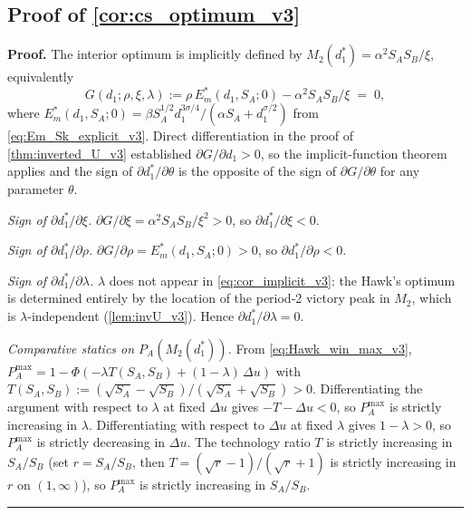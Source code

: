 \documentclass[11pt,twoside]{extarticle}
\newenvironment{proof}[1][Proof]{\noindent \textbf{#1.} }{\ \rule{0.5em}{0.5em}}
\begin{document}
\subsection*{Proof of \autoref{cor:cs_optimum_v3}} \label{app:proof:cs_optimum_v3}
\begin{proof}
The interior optimum is implicitly defined by $M_2(d_1^*)=\alpha^2 S_A S_B/\xi$, equivalently
\begin{equation}\label{eq:cor_implicit_v3}
G(d_1;\rho,\xi,\lambda):=\rho\,E_m^*(d_1,S_A;0)-\alpha^2 S_A S_B/\xi\;=\;0,
\end{equation}
where $E_m^*(d_1,S_A;0)=\beta S_A^{1/2} d_1^{3\sigma/4}/(\alpha S_A+d_1^{\sigma/2})$ from \autoref{eq:Em_Sk_explicit_v3}. Direct differentiation in the proof of \autoref{thm:inverted_U_v3} established $\partial G/\partial d_1>0$, so the implicit-function theorem applies and the sign of $\partial d_1^*/\partial\theta$ is the opposite of the sign of $\partial G/\partial\theta$ for any parameter $\theta$.

\emph{Sign of $\partial d_1^*/\partial\xi$.} $\partial G/\partial\xi=\alpha^2 S_A S_B/\xi^2>0$, so $\partial d_1^*/\partial\xi<0$.

\emph{Sign of $\partial d_1^*/\partial\rho$.} $\partial G/\partial\rho=E_m^*(d_1,S_A;0)>0$, so $\partial d_1^*/\partial\rho<0$.

\emph{Sign of $\partial d_1^*/\partial\lambda$.} $\lambda$ does not appear in \autoref{eq:cor_implicit_v3}: the Hawk's optimum is determined entirely by the location of the period-2 victory peak in $M_2$, which is $\lambda$-independent (\autoref{lem:invU_v3}). Hence $\partial d_1^*/\partial\lambda=0$.

\emph{Comparative statics on $P_A(M_2(d_1^*))$.} From \autoref{eq:Hawk_win_max_v3},
$P_A^{\max}=1-\Phi(-\lambda T(S_A,S_B)+(1-\lambda)\,\Delta u)$ with $T(S_A,S_B):=(\sqrt{S_A}-\sqrt{S_B})/(\sqrt{S_A}+\sqrt{S_B})>0$. Differentiating the argument with respect to $\lambda$ at fixed $\Delta u$ gives $-T-\Delta u<0$, so $P_A^{\max}$ is strictly increasing in $\lambda$. Differentiating with respect to $\Delta u$ at fixed $\lambda$ gives $1-\lambda>0$, so $P_A^{\max}$ is strictly decreasing in $\Delta u$. The technology ratio $T$ is strictly increasing in $S_A/S_B$ (set $r=S_A/S_B$, then $T=(\sqrt r-1)/(\sqrt r+1)$ is strictly increasing in $r$ on $(1,\infty)$), so $P_A^{\max}$ is strictly increasing in $S_A/S_B$.
\end{proof}

\end{document}

